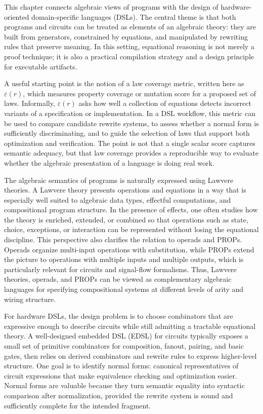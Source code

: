 This chapter connects algebraic views of programs with the design of hardware-oriented domain-specific languages (DSLs). The central theme is that both programs and circuits can be treated as elements of an algebraic theory: they are built from generators, constrained by equations, and manipulated by rewriting rules that preserve meaning. In this setting, equational reasoning is not merely a proof technique; it is also a practical compilation strategy and a design principle for executable artifacts.

A useful starting point is the notion of a law coverage metric, written here as \(\varepsilon(r)\), which measures property coverage or mutation score for a proposed set of laws. Informally, \(\varepsilon(r)\) asks how well a collection of equations detects incorrect variants of a specification or implementation. In a DSL workflow, this metric can be used to compare candidate rewrite systems, to assess whether a normal form is sufficiently discriminating, and to guide the selection of laws that support both optimization and verification. The point is not that a single scalar score captures semantic adequacy, but that law coverage provides a reproducible way to evaluate whether the algebraic presentation of a language is doing real work.

The algebraic semantics of programs is naturally expressed using Lawvere theories. A Lawvere theory presents operations and equations in a way that is especially well suited to algebraic data types, effectful computations, and compositional program structure. In the presence of effects, one often studies how the theory is enriched, extended, or combined so that operations such as state, choice, exceptions, or interaction can be represented without losing the equational discipline. This perspective also clarifies the relation to operads and PROPs. Operads organize multi-input operations with substitution, while PROPs extend the picture to operations with multiple inputs and multiple outputs, which is particularly relevant for circuits and signal-flow formalisms. Thus, Lawvere theories, operads, and PROPs can be viewed as complementary algebraic languages for specifying compositional systems at different levels of arity and wiring structure.

For hardware DSLs, the design problem is to choose combinators that are expressive enough to describe circuits while still admitting a tractable equational theory. A well-designed embedded DSL (EDSL) for circuits typically exposes a small set of primitive combinators for composition, fanout, pairing, and basic gates, then relies on derived combinators and rewrite rules to express higher-level structure. One goal is to identify normal forms: canonical representatives of circuit expressions that make equivalence checking and optimization easier. Normal forms are valuable because they turn semantic equality into syntactic comparison after normalization, provided the rewrite system is sound and sufficiently complete for the intended fragment.

